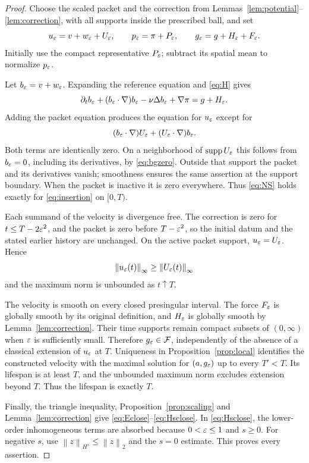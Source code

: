 \documentclass[11pt,a4paper]{article}
\theoremstyle{definition}\newtheorem{definition}[theorem]{Definition}
\theoremstyle{remark}\newtheorem{remark}[theorem]{Remark}
\newcommand{\FF}{\mathcal F}\newcommand{\XX}{\mathcal X}
\newcommand{\norm}[1]{\left\lVert#1\right\rVert}
\DeclareMathOperator{\supp}{supp}
\begin{document}
\begin{proof}
Choose the scaled packet and the correction from Lemmas~\ref{lem:potential}--\ref{lem:correction}, with all supports inside the prescribed ball, and set
\begin{equation}\label{eq:insertion}
 u_\varepsilon=v+w_\varepsilon+U_\varepsilon,\qquad
 p_\varepsilon=\pi+P_\varepsilon,\qquad
 g_\varepsilon=g+H_\varepsilon+F_\varepsilon.
\end{equation}
Initially use the compact representative $P_\varepsilon$; subtract its spatial mean to normalize $p_\varepsilon$.

Let $b_\varepsilon=v+w_\varepsilon$. Expanding the reference equation and \eqref{eq:H} gives
\[
 \partial_tb_\varepsilon+(b_\varepsilon\cdot\nabla)b_\varepsilon
 -\nu\Delta b_\varepsilon+\nabla\pi=g+H_\varepsilon.
\]
Adding the packet equation produces the equation for $u_\varepsilon$ except for
\[
 (b_\varepsilon\cdot\nabla)U_\varepsilon+(U_\varepsilon\cdot\nabla)b_\varepsilon.
\]
Both terms are identically zero. On a neighborhood of $\supp U_\eps$ this follows from $b_\varepsilon=0$, including its derivatives, by \eqref{eq:bgzero}. Outside that support the packet and its derivatives vanish; smoothness ensures the same assertion at the support boundary. When the packet is inactive it is zero everywhere. Thus \eqref{eq:NS} holds exactly for \eqref{eq:insertion} on $[0,T)$.

Each summand of the velocity is divergence free. The correction is zero for
$t\le T-2\varepsilon^2$, and the packet is zero before $T-\varepsilon^2$, so the initial datum and the stated earlier history are unchanged. On the active packet support, $u_\varepsilon=U_\varepsilon$. Hence
\[
 \norm{u_\eps(t)}_\infty\ge\norm{U_\eps(t)}_\infty
\]
and the maximum norm is unbounded as $t\uparrow T$.

The velocity is smooth on every closed presingular interval. The force $F_\varepsilon$ is globally smooth by its original definition, and $H_\varepsilon$ is globally smooth by Lemma~\ref{lem:correction}. Their time supports remain compact subsets of $(0,\infty)$ when $\varepsilon$ is sufficiently small. Therefore $g_\eps\in\FF$, independently of the absence of a classical extension of $u_\varepsilon$ at $T$. Uniqueness in Proposition~\ref{prop:local} identifies the constructed velocity with the maximal solution for $(a,g_\varepsilon)$ up to every $T'<T$. Its lifespan is at least $T$, and the unbounded maximum norm excludes extension beyond $T$. Thus the lifespan is exactly $T$.

Finally, the triangle inequality, Proposition~\ref{prop:scaling} and
Lemma~\ref{lem:correction} give \eqref{eq:Eclose}--\eqref{eq:Hsclose}. In
\eqref{eq:Hsclose}, the lower-order inhomogeneous terms are absorbed because
$0<\varepsilon\le1$ and $s\ge0$. For negative $s$, use
$\norm{z}_{H^s}\le\norm{z}_2$ and the $s=0$ estimate. This proves every assertion.
\end{proof}
\end{document}
